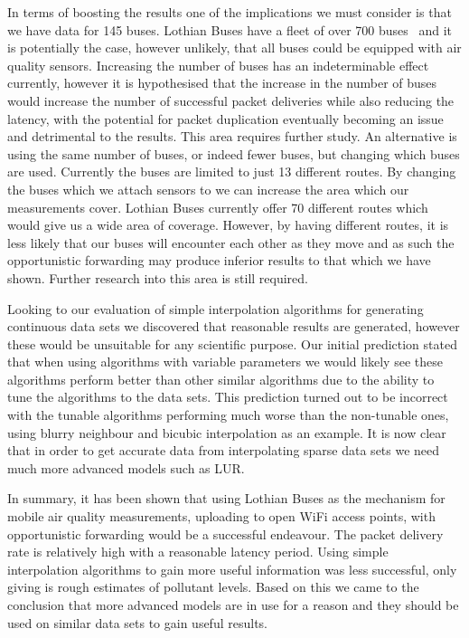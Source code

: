 In terms of boosting the results one of the implications we must consider is that we have data for 145 buses. Lothian Buses have a fleet of over 700 buses~\cite{lothianbusannualreport} and it is potentially the case, however unlikely, that all buses could be equipped with air quality sensors. Increasing the number of buses has an indeterminable effect currently, however it is hypothesised that the increase in the number of buses would increase the number of successful packet deliveries while also reducing the latency, with the potential for packet duplication eventually becoming an issue and detrimental to the results. This area requires further study. An alternative is using the same number of buses, or indeed fewer buses, but changing which buses are used. Currently the buses are limited to just 13 different routes. By changing the buses which we attach sensors to we can increase the area which our measurements cover. Lothian Buses currently offer 70 different routes which would give us a wide area of coverage. However, by having different routes, it is less likely that our buses will encounter each other as they move and as such the opportunistic forwarding may produce inferior results to that which we have shown. Further research into this area is still required.

Looking to our evaluation of simple interpolation algorithms for generating continuous data sets we discovered that reasonable results are generated, however these would be unsuitable for any scientific purpose. Our initial prediction stated that when using algorithms with variable parameters we would likely see these algorithms perform better than other similar algorithms due to the ability to tune the algorithms to the data sets. This prediction turned out to be incorrect with the tunable algorithms performing much worse than the non-tunable ones, using blurry neighbour and bicubic interpolation as an example. It is now clear that in order to get accurate data from interpolating sparse data sets we need much more advanced models such as LUR.

In summary, it has been shown that using Lothian Buses as the mechanism for mobile air quality measurements, uploading to open WiFi access points, with opportunistic forwarding would be a successful endeavour. The packet delivery rate is relatively high with a reasonable latency period. Using simple interpolation algorithms to gain more useful information was less successful, only giving is rough estimates of pollutant levels. Based on this we came to the conclusion that more advanced models are in use for a reason and they should be used on similar data sets to gain useful results. 


